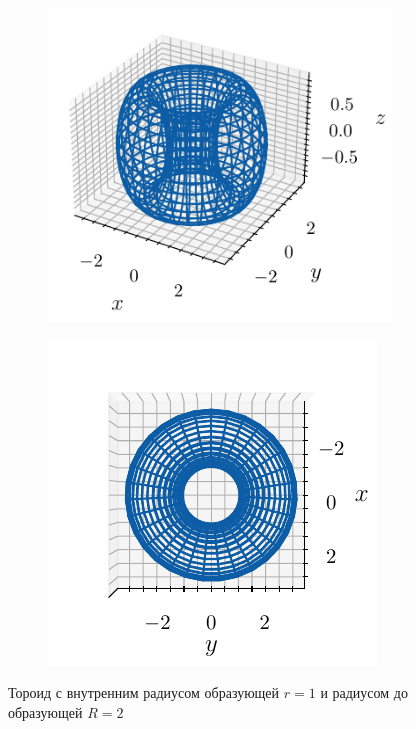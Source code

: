 \begin{figure}[H]
    \centering
    \begin{subfigure}{0.49\linewidth}
        \centering
        \includegraphics[width=1\linewidth]{figs/20/tor}
    \end{subfigure}
    \begin{subfigure}{0.49\linewidth}
        \centering
        \includegraphics[width=1\linewidth]{figs/20/tor-top}
    \end{subfigure}
    \caption{Тороид с внутренним радиусом образующей $r=1$  и радиусом до
    образующей $R=2$}
    \label{fig:tor}
\end{figure}

